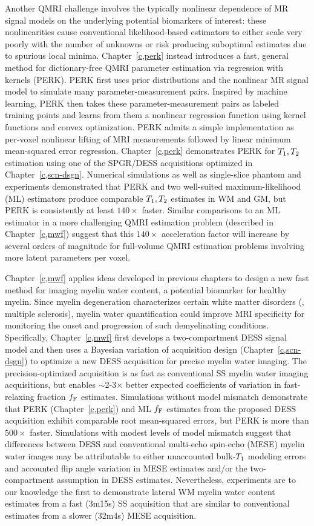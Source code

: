 Another QMRI challenge
involves the typically nonlinear dependence 
of MR signal models
on the underlying potential biomarkers of interest:
these nonlinearities 
cause conventional likelihood-based estimators
to either scale very poorly 
with the number of unknowns
or risk producing suboptimal estimates
due to spurious local minima.
Chapter~\ref{c,perk} instead introduces
a fast, general method 
for dictionary-free QMRI parameter estimation
via regression with kernels (PERK).
PERK first uses prior distributions 
and the nonlinear MR signal model 
to simulate many parameter-measurement pairs.
Inspired by machine learning,
PERK then takes these parameter-measurement pairs
as labeled training points
and learns from them a nonlinear regression function
using kernel functions and convex optimization.
PERK admits a simple implementation
as per-voxel nonlinear lifting
of MRI measurements 
followed by linear minimum mean-squared error regression.
Chapter~\ref{c,perk} demonstrates PERK
for $T_1,T_2$ estimation
using one of the SPGR/DESS acquisitions
optimized in Chapter~\ref{c,scn-dsgn}.
Numerical simulations 
as well as single-slice phantom and \invivo experiments
demonstrated that PERK 
and two well-suited maximum-likelihood (ML) estimators
produce comparable $T_1,T_2$ estimates in WM and GM,
but PERK is consistently at least $140\times$ faster.
Similar comparisons to an ML estimator  
in a more challenging QMRI estimation problem
(described in Chapter~\ref{c,mwf})
suggest that this $140\times$ acceleration factor
will increase by several orders of magnitude
for full-volume QMRI estimation problems
involving more latent parameters per voxel.

Chapter~\ref{c,mwf} applies ideas 
developed in previous chapters
to design a new fast method
for imaging myelin water content,
a potential biomarker for healthy myelin.
Since myelin degeneration characterizes
certain white matter disorders
(\eg, multiple sclerosis),
myelin water quantification
could improve MRI specificity
for monitoring the onset and progression
of such demyelinating conditions.
Specifically,
Chapter~\ref{c,mwf} first develops 
a two-compartment DESS signal model
and then uses a Bayesian variation 
of acquisition design (Chapter~\ref{c,scn-dsgn})
to optimize a new DESS acquisition
for precise myelin water imaging.
The precision-optimized acquisition
is as fast as conventional SS myelin water imaging acquisitions,
but enables $\sim$2-3$\times$ better
expected coefficients of variation
in fast-relaxing fraction $f_{\mathrm{F}}$ estimates.
Simulations without model mismatch demonstrate
that PERK (Chapter~\ref{c,perk}) and ML $f_{\mathrm{F}}$ estimates
from the proposed DESS acquisition
exhibit comparable root mean-squared errors,
but PERK is more than $500\times$ faster.
Simulations with modest levels of model mismatch suggest
that \invivo differences between DESS 
and conventional multi-echo spin-echo (MESE) 
myelin water images 
may be attributable 
to either unaccounted bulk-$T_1$ modeling errors
and accounted flip angle variation 
in MESE estimates 
and/or 
the two-compartment assumption 
in DESS estimates.
Nevertheless,
\invivo experiments are to our knowledge the first
to demonstrate lateral WM myelin water content estimates
from a fast (3m15s) SS acquisition
that are similar 
to conventional estimates 
from a slower (32m4s) MESE acquisition.
